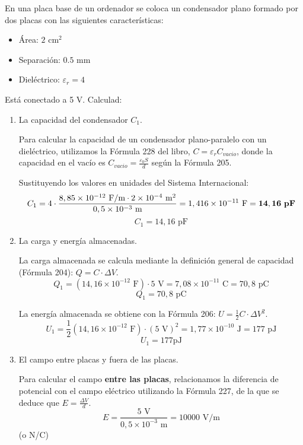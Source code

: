 \documentclass[11pt, a4paper]{article}
\newenvironment{problem}[1][Cuestión]{
		\vspace{0.5cm}
		\noindent{\Large\bfseries #1} \par\vspace{0.5cm}
}{
		\vspace{0.5cm}
}
\begin{document}
	\begin{problem}[Problema]
		En una placa base de un ordenador se coloca un condensador plano formado por dos placas con las siguientes características:

		\begin{itemize}
			\item Área: $2 \text{ cm}^2$
			\item Separación: $0.5 \text{ mm}$
			\item Dieléctrico: $\varepsilon_r = 4$
		\end{itemize}

		Está conectado a 5 V. Calculad:

		\begin{enumerate}[label=\alph*)] 
			\item La capacidad del condensador $C_1$.

				{ \color{blue} 
					Para calcular la capacidad de un condensador plano-paralelo con un dieléctrico, utilizamos la Fórmula 228 del libro, $C = \varepsilon_r C_{vacio}$, donde la capacidad en el vacío es $C_{vacio} = \frac{\varepsilon_0 S}{d}$ según la Fórmula 205. 

					Sustituyendo los valores en unidades del Sistema Internacional:
					$$C_1 = 4 \cdot \frac{8,85 \times 10^{-12} \text{ F/m} \cdot 2 \times 10^{-4} \text{ m}^2}{0,5 \times 10^{-3} \text{ m}} = 1,416 \times 10^{-11} \text{ F} = \mathbf{14,16 \text{ \textbf{pF}}}$$
					$$\boxed{C_1 = 14,16 \text{ pF}}$$
				}

			\item La carga y energía almacenadas.

				{ \color{blue} 
					La carga almacenada se calcula mediante la definición general de capacidad (Fórmula 204): $Q = C \cdot \Delta V$.
					$$Q_1 = (14,16 \times 10^{-12} \text{ F}) \cdot 5 \text{ V} = 7,08 \times 10^{-11} \text{ C} = 70,8 \text{ pC}$$
					$$\boxed{Q_1 = 70,8 \text{ pC}}$$

					La energía almacenada se obtiene con la Fórmula 206: $U = \frac{1}{2} C \cdot \Delta V^2$.
					$$U_1 = \frac{1}{2} (14,16 \times 10^{-12} \text{ F}) \cdot (5 \text{ V})^2 = 1,77 \times 10^{-10} \text{ J} = 177 \text{ pJ}$$
					$$\boxed{U_1 = 177 \text{pJ}}$$
				}

			\item El campo entre placas y fuera de las placas.

				{ \color{blue} 
					Para calcular el campo \textbf{entre las placas}, relacionamos la diferencia de potencial con el campo eléctrico utilizando la Fórmula 227, de la que se deduce que $E = \frac{\Delta V}{d}$.
					$$\boxed{E = \frac{5 \text{ V}}{0,5 \times 10^{-3} \text{ m}} = 10000 \text{ V/m}}$$ (o N/C)

}
\end{enumerate}
\end{problem}
\end{document}
